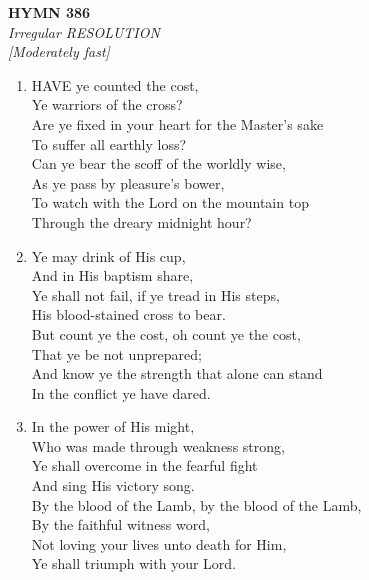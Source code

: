 \newpage
\begin{center}
    {\Large \textbf{HYMN 386}}
    \\
    \textit{Irregular RESOLUTION}
    \\
    \textit{\small [Moderately fast]}
\end{center}
\vspace{1em}

\begin{enumerate}
    \item HAVE ye counted the cost, \\
        Ye warriors of the cross? \\
        Are ye fixed in your heart for the Master's sake \\
        To suffer all earthly loss? \\
        Can ye bear the scoff of the worldly wise, \\
        As ye pass by pleasure's bower, \\
        To watch with the Lord on the mountain top \\
        Through the dreary midnight hour?

    \item Ye may drink of His cup, \\
        And in His baptism share, \\
        Ye shall not fail, if ye tread in His steps, \\
        His blood-stained cross to bear. \\
        But count ye the cost, oh count ye the cost, \\
        That ye be not unprepared; \\
        And know ye the strength that alone can stand \\
        In the conflict ye have dared.

    \item In the power of His might, \\
        Who was made through weakness strong, \\
        Ye shall overcome in the fearful fight \\
        And sing His victory song. \\
        By the blood of the Lamb, by the blood of the Lamb, \\
        By the faithful witness word, \\
        Not loving your lives unto death for Him, \\
        Ye shall triumph with your Lord.


\end{enumerate}
